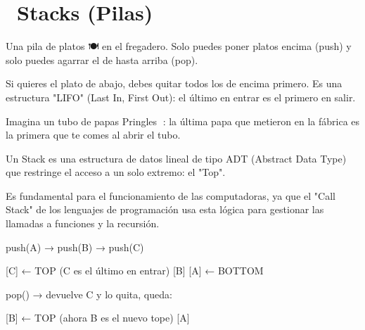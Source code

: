 ﻿\chapter[\emj{📚}~Stacks (Pilas)]{~Stacks (Pilas)}

\begin{dsaquees}

Una pila de platos 🍽️ en el fregadero. Solo puedes poner platos
encima (push) y solo puedes agarrar el de hasta arriba (pop). 

Si quieres el plato de abajo, debes quitar todos los de encima primero. 
Es una estructura "LIFO" (Last In, First Out): el último en entrar
es el primero en salir.

Imagina un tubo de papas Pringles 🥔: la última papa que metieron
en la fábrica es la primera que te comes al abrir el tubo.

\end{dsaquees}

\begin{dsaotraforma}

Un Stack es una estructura de datos lineal de tipo ADT (Abstract Data
Type) que restringe el acceso a un solo extremo: el "Top". 

Es fundamental para el funcionamiento de las computadoras, ya que
el "Call Stack" de los lenguajes de programación usa esta lógica
para gestionar las llamadas a funciones y la recursión.

\end{dsaotraforma}

\begin{dsadiagrama}
push(A) → push(B) → push(C)

     [C]  ← TOP (C es el último en entrar)
     [B]
     [A]  ← BOTTOM

pop() → devuelve C y lo quita, queda:

     [B]  ← TOP (ahora B es el nuevo tope)
     [A]
\end{dsadiagrama}

